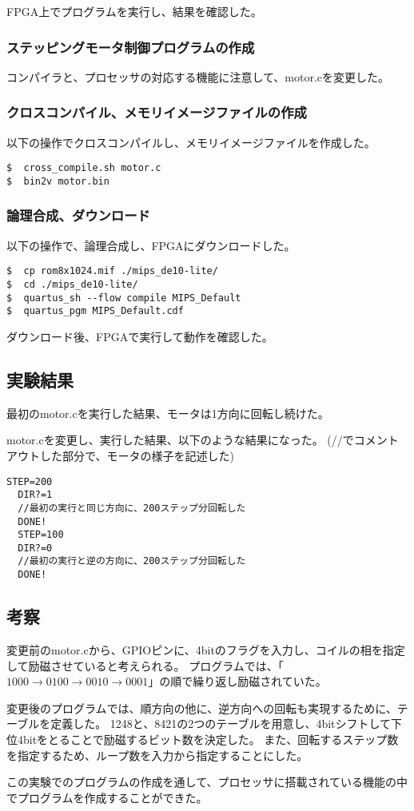FPGA上でプログラムを実行し、結果を確認した。

\subsubsection{ステッピングモータ制御プログラムの作成}
コンパイラと、プロセッサの対応する機能に注意して、motor.cを変更した。


\subsubsection{クロスコンパイル、メモリイメージファイルの作成}
以下の操作でクロスコンパイルし、メモリイメージファイルを作成した。
\begin{lstlisting}[caption={クロスコンパイル、メモリイメージファイルの作成},label={クロスコンパイル、メモリイメージファイルの作成28}]
$  cross_compile.sh motor.c
$  bin2v motor.bin
\end{lstlisting}

\subsubsection{論理合成、ダウンロード}
以下の操作で、論理合成し、FPGAにダウンロードした。
\begin{lstlisting}[caption={論理合成、ダウンロード},label={論理合成、ダウンロード28}]
$  cp rom8x1024.mif ./mips_de10-lite/
$  cd ./mips_de10-lite/
$  quartus_sh --flow compile MIPS_Default
$  quartus_pgm MIPS_Default.cdf
\end{lstlisting}

ダウンロード後、FPGAで実行して動作を確認した。

\subsection{実験結果}
最初のmotor.cを実行した結果、モータは1方向に回転し続けた。

motor.cを変更し、実行した結果、以下のような結果になった。
(//でコメントアウトした部分で、モータの様子を記述した)
\begin{lstlisting}[caption={変更したmotor.cの実行結果},label={変更したmotor.cの実行結果}]
  STEP=200
  DIR?=1
  //最初の実行と同じ方向に、200ステップ分回転した
  DONE!
  STEP=100
  DIR?=0
  //最初の実行と逆の方向に、200ステップ分回転した
  DONE!
\end{lstlisting}

\subsection{考察}
変更前のmotor.cから、GPIOピンに、4bitのフラグを入力し、コイルの相を指定して励磁させていると考えられる。
プログラムでは、「$1000\rightarrow 0100\rightarrow 0010\rightarrow 0001$」の順で繰り返し励磁されていた。

変更後のプログラムでは、順方向の他に、逆方向への回転も実現するために、テーブルを定義した。
1248と、8421の2つのテーブルを用意し、4bitシフトして下位4bitをとることで励磁するビット数を決定した。
また、回転するステップ数を指定するため、ループ数を入力から指定することにした。

この実験でのプログラムの作成を通して、プロセッサに搭載されている機能の中でプログラムを作成することができた。
